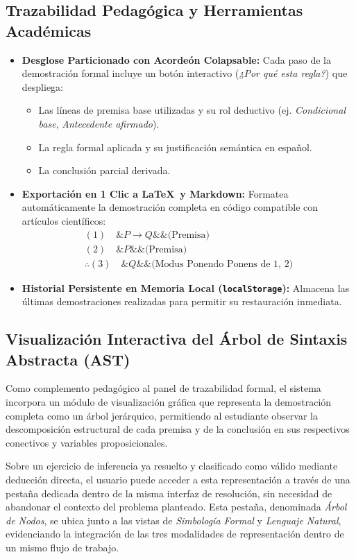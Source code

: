 \documentclass[11pt,a4paper]{article}
\begin{document}
\subsection{Trazabilidad Pedagógica y Herramientas Académicas}
\begin{itemize}[leftmargin=1.2cm]
    \item \textbf{Desglose Particionado con Acordeón Colapsable:} Cada paso de la demostración formal incluye un botón interactivo (\textit{¿Por qué esta regla?}) que despliega:
    \begin{itemize}
        \item Las líneas de premisa base utilizadas y su rol deductivo (ej. \textit{Condicional base}, \textit{Antecedente afirmado}).
        \item La regla formal aplicada y su justificación semántica en español.
        \item La conclusión parcial derivada.
    \end{itemize}
    \item \textbf{Exportación en 1 Clic a \LaTeX\ y Markdown:} Formatea automáticamente la demostración completa en código compatible con artículos científicos:
    $$\begin{aligned}
        (1) \quad \& P \to Q \&\& \text{(Premisa)} \\
        (2) \quad \& P \&\& \text{(Premisa)} \\
        \therefore (3) \quad \& Q \&\& \text{(Modus Ponendo Ponens de 1, 2)}
    \end{aligned}$$
    \item \textbf{Historial Persistente en Memoria Local (\texttt{localStorage}):} Almacena las últimas demostraciones realizadas para permitir su restauración inmediata.
\end{itemize}

\subsection{Visualización Interactiva del Árbol de Sintaxis Abstracta (AST)}

Como complemento pedagógico al panel de trazabilidad formal, el sistema incorpora un módulo de visualización gráfica que representa la demostración completa como un árbol jerárquico, permitiendo al estudiante observar la descomposición estructural de cada premisa y de la conclusión en sus respectivos conectivos y variables proposicionales.

Sobre un ejercicio de inferencia ya resuelto y clasificado como válido mediante deducción directa, el usuario puede acceder a esta representación a través de una pestaña dedicada dentro de la misma interfaz de resolución, sin necesidad de abandonar el contexto del problema planteado. Esta pestaña, denominada \textit{Árbol de Nodos}, se ubica junto a las vistas de \textit{Simbología Formal} y \textit{Lenguaje Natural}, evidenciando la integración de las tres modalidades de representación dentro de un mismo flujo de trabajo.
\end{document}
